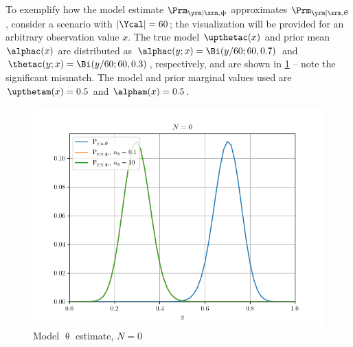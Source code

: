 \documentclass[12pt]{report}
\begin{document}
To exemplify how the model estimate $\Prm_{\yrm | \xrm,\uppsi}$ approximates $\Prm_{\yrm | \xrm,\uptheta}$, consider a scenario with $|\Ycal| = 60$; the visualization will be provided for an arbitrary observation value $x$. The true model $\upthetac(x)$ and prior mean $\alphac(x)$ are distributed as $\alphac(y;x) = \Bi(y/60; 60, 0.7)$ and $\thetac(y;x) = \Bi(y/60; 60, 0.3)$, respectively, and are shown in \cref{fig:model_est/N_0} -- note the significant mismatch. The model and prior marginal values used are $\upthetam(x) = 0.5$ and $\alpham(x) = 0.5$.
\begin{figure}
	\centering
	\includegraphics[width=0.8\linewidth]{model_est/N_0.png}
	\caption{Model $\uptheta$ estimate, $N=0$}
	\label{fig:model_est/N_0}
\end{figure}
\end{document}
